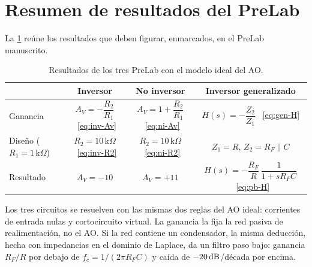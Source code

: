 \section{Resumen de resultados del PreLab}\label{sec:resumen}
La \cref{tab:resumen} reúne los resultados que deben figurar, enmarcados, en el PreLab manuscrito.

\begin{table}[ht]
\centering\small
\renewcommand{\arraystretch}{1.45}
\caption{Resultados de los tres PreLab con el modelo ideal del AO.}
\label{tab:resumen}
\begin{tabular}{@{}lccc@{}}
\toprule
 & Inversor & No inversor & Inversor generalizado\\
\midrule
Ganancia & $A_V=-\dfrac{R_2}{R_1}$ \ \eqref{eq:inv-Av} & $A_V=1+\dfrac{R_2}{R_1}$ \ \eqref{eq:ni-Av}
         & $H(s)=-\dfrac{Z_2}{Z_1}$ \ \eqref{eq:gen-H}\\
Diseño ($R_1=1\,\mathrm{k}\Omega$) & $R_2=10\,\mathrm{k}\Omega$ \ \eqref{eq:inv-R2} & $R_2=10\,\mathrm{k}\Omega$ \ \eqref{eq:ni-R2}
       & $Z_1=R$, $Z_2=R_F\parallel C$\\
Resultado & $A_V=-10$ & $A_V=+11$ & $H(s)=-\dfrac{R_F}{R}\,\dfrac{1}{1+sR_FC}$ \ \eqref{eq:pb-H}\\
\bottomrule
\end{tabular}
\end{table}

Los tres circuitos se resuelven con las mismas dos reglas del AO ideal: corrientes de entrada nulas
y cortocircuito virtual. La ganancia la fija la red pasiva de realimentación, no el AO. Si la red
contiene un condensador, la misma deducción, hecha con impedancias en el dominio de Laplace, da un
filtro paso bajo: ganancia $R_F/R$ por debajo de $f_c=1/(2\pi R_FC)$ y caída de $-20\,\mathrm{dB}$/década por encima.
